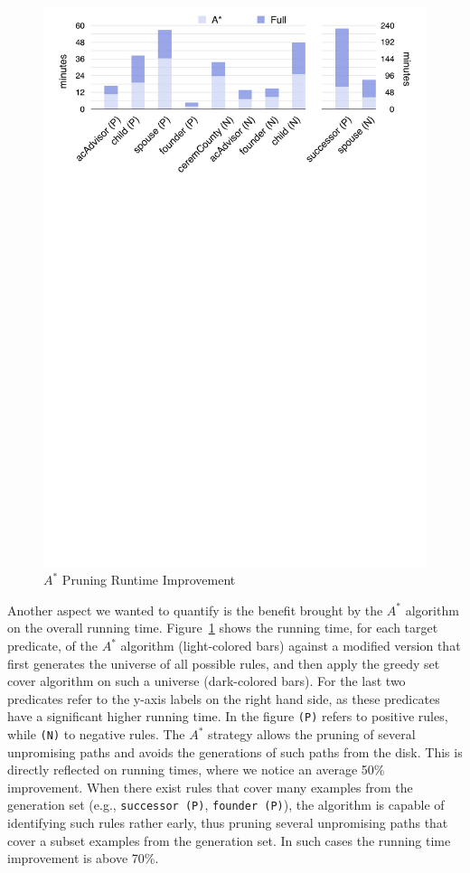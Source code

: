 \begin{figure}[b]
	\centering
	\includegraphics[width=\columnwidth]{include/figure/a*_runtime_improv.pdf}
	\caption{$A^*$ Pruning Runtime Improvement}
	\label{fig:pruning_impact}
\end{figure}
Another aspect we wanted to quantify is the benefit brought by the $A^*$ algorithm on the overall running time. Figure~\ref{fig:pruning_impact} shows the running time, for each target predicate, of the $A^*$ algorithm (light-colored bars) against a modified version that first generates the universe of all possible rules, and then apply the greedy set cover algorithm on such a universe (dark-colored bars). For the last two predicates refer to the y-axis labels on the right hand side, as these predicates have a significant higher running time. In the figure \texttt{(P)} refers to positive rules, while \texttt{(N)} to negative rules.
The $A^*$ strategy allows the pruning of several unpromising paths and avoids the generations of such paths from the disk. This is directly reflected on running times, where we notice an average 50\% improvement. When there exist rules that cover many examples from the generation set (e.g., \texttt{successor (P)}, \texttt{founder (P)}), the algorithm is capable of identifying such rules rather early, thus pruning several unpromising paths that cover a subset examples from the generation set. In such cases the running time improvement is above 70\%.
